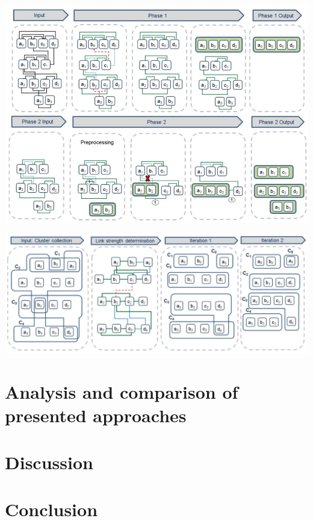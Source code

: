 \documentclass[runningheads]{llncs}
\begin{document}
\begin{center}
\includegraphics[width=1\textwidth]{clip_example.png}
\end{center}

\begin{center}
\includegraphics[width=1\textwidth]{clip_overlap_resolution.png}
\end{center}


\section{Analysis and comparison of presented approaches}
\section{Discussion}
\section{Conclusion}
\end{document}

